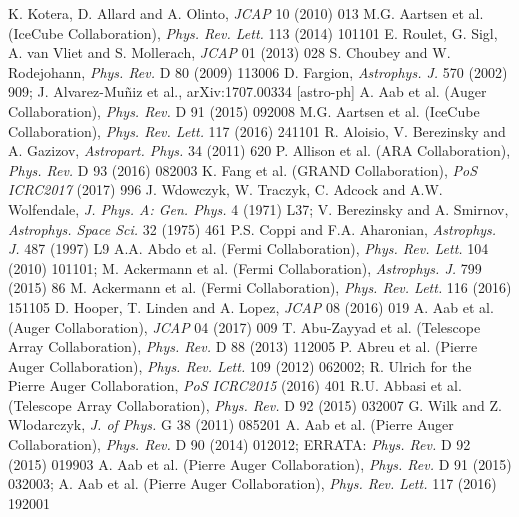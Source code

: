 \documentclass[twoside,12pt]{article}
\begin{document}
\begin{thebibliography}{99}
 K. Kotera, D. Allard and A. Olinto, {\it JCAP} 10 (2010) 013
 M.G. Aartsen et al.  (IceCube Collaboration), {\it Phys. Rev. Lett.} 113 (2014) 101101  %
 E. Roulet, G. Sigl, A. van Vliet and S. Mollerach, {\it JCAP} 01 (2013) 028  %
 S. Choubey and W. Rodejohann, {\it Phys. Rev.} D 80 (2009) 113006 %
  D.  Fargion,  {\it Astrophys. J.} 570 (2002)  909; J. Alvarez-Mu\~niz et al., arXiv:1707.00334 [astro-ph]
 A. Aab et al. (Auger Collaboration), {\it  Phys. Rev.} D 91 (2015) 092008  %
  M.G. Aartsen et al. (IceCube Collaboration), {\it  Phys. Rev. Lett.} 117 (2016) 241101    %
 R. Aloisio, V. Berezinsky and A. Gazizov,  {\it Astropart. Phys.} 34 (2011) 620  %
 P. Allison et al. (ARA Collaboration), {\it Phys. Rev.} D 93 (2016) 082003
 K. Fang et al. (GRAND Collaboration), {\it PoS ICRC2017} (2017) 996
  J. Wdowczyk, W. Traczyk, C. Adcock and A.W. Wolfendale, {\it J. Phys. A: Gen. Phys.} 4 (1971) L37; V. Berezinsky and A. Smirnov, {\it Astrophys. Space Sci.} 32 (1975) 461  
 P.S. Coppi and F.A. Aharonian, {\it Astrophys. J.} 487 (1997) L9
 A.A. Abdo et al. (Fermi Collaboration), {\it Phys. Rev. Lett.} 104 (2010) 101101; M. Ackermann et al. (Fermi Collaboration), {\it Astrophys. J.} 799 (2015) 86  %
 M. Ackermann et al. (Fermi Collaboration), {\it Phys. Rev. Lett.} 116 (2016) 151105
 D. Hooper, T. Linden and A. Lopez, {\it JCAP} 08 (2016) 019  %
 A. Aab et al. (Auger Collaboration), {\it JCAP} 04 (2017) 009  %
 T. Abu-Zayyad et al. (Telescope Array Collaboration), {\it Phys. Rev.} D 88 (2013) 112005  %
 P. Abreu et al. (Pierre Auger Collaboration), {\it Phys. Rev. Lett.} 109 (2012) 062002; R. Ulrich for the Pierre Auger Collaboration, {\it PoS ICRC2015} (2016) 401
 R.U. Abbasi et al. (Telescope Array Collaboration), {\it Phys. Rev.} D 92 (2015) 032007
 G. Wilk and Z. Wlodarczyk, {\it J. of Phys.} G 38 (2011) 085201
  A. Aab et al. (Pierre Auger Collaboration),  {\it Phys. Rev.} D 90 (2014) 012012;  ERRATA: {\it Phys. Rev.} D 92 (2015)  019903   %
  A. Aab et al. (Pierre Auger Collaboration), {\it Phys. Rev.} D 91 (2015) 032003; A. Aab et al. (Pierre Auger Collaboration), {\it Phys. Rev. Lett.} 117 (2016) 192001  %

\end{thebibliography}
\end{document}
